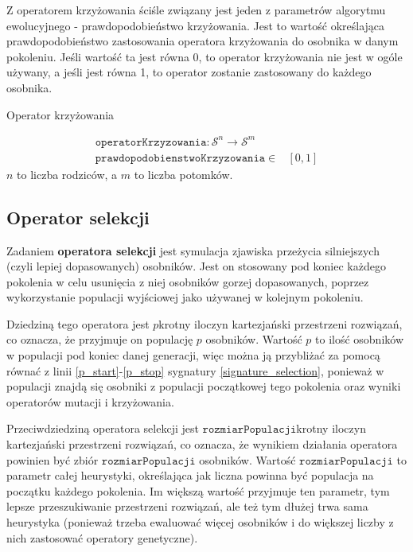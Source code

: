 \documentclass[twoside]{iisthesis}
\newcommand{\important}{\mathcal}
\newcommand{\param}{\mathtt}
\begin{document}
Z operatorem krzyżowania ściśle związany jest jeden z parametrów algorytmu ewolucyjnego - prawdopodobieństwo krzyżowania. Jest to wartość określająca prawdopodobieństwo zastosowania operatora krzyżowania do osobnika w danym pokoleniu. Jeśli wartość ta jest równa 0, to operator krzyżowania nie jest w ogóle używany, a jeśli jest równa 1, to operator zostanie zastosowany do każdego osobnika.

\begin{signature}
	\caption{Operator krzyżowania \label{signature_crossover}}
	\begin{align}
	\param{operatorKrzyzowania}: \important{S}^n \rightarrow \important{S}^m \\
	\param{prawdopodobienstwoKrzyzowania} \in &[0, 1]
	\end{align}
	$n$ to liczba rodziców, a $m$ to liczba potomków.
\end{signature}	

\subsection{Operator selekcji} \label{subsection_natSel}

Zadaniem \textbf{operatora selekcji} jest symulacja zjawiska przeżycia silniejszych (czyli lepiej dopasowanych) osobników. Jest on stosowany pod koniec każdego pokolenia w celu usunięcia z niej osobników gorzej dopasowanych, poprzez wykorzystanie populacji wyjściowej jako używanej w kolejnym pokoleniu.

Dziedziną tego operatora jest $p$krotny iloczyn kartezjański przestrzeni rozwiązań, co oznacza, że przyjmuje on populację $p$ osobników. Wartość $p$ to ilość osobników w populacji pod koniec danej generacji, więc można ją przybliżać za pomocą równać z linii \ref{p_start}-\ref{p_stop} sygnatury \ref{signature_selection}, ponieważ w populacji znajdą się osobniki z populacji początkowej tego pokolenia oraz wyniki operatorów mutacji i krzyżowania. 

Przeciwdziedziną operatora selekcji jest $\param{rozmiarPopulacji}$krotny iloczyn kartezjański przestrzeni rozwiązań, co oznacza, że wynikiem działania operatora powinien być zbiór $\param{rozmiarPopulacji}$ osobników. Wartość $\param{rozmiarPopulacji}$ to parametr całej heurystyki, określająca jak liczna powinna być populacja na początku każdego pokolenia. Im większą wartość przyjmuje ten parametr, tym lepsze przeszukiwanie przestrzeni rozwiązań, ale też tym dłużej trwa sama heurystyka (ponieważ trzeba ewaluować więcej osobników i do większej liczby z nich zastosować operatory genetyczne). 
\end{document}
